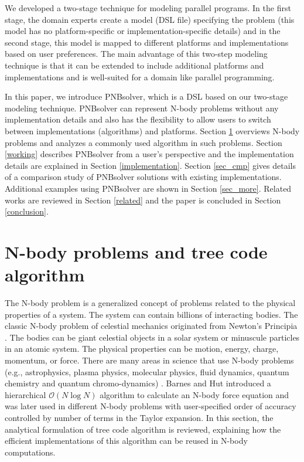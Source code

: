 \documentclass[draftclsnofoot]{elsarticle}
\begin{document}
We developed a two-stage technique for modeling parallel programs. In the first stage, the domain experts create a model (DSL file) specifying 
the problem (this model has no platform-specific or implementation-specific details) and in the second stage,  this model is mapped to different platforms and implementations
 based on user preferences. The main advantage of this two-step modeling technique is that it can be extended to include additional platforms and implementations and is well-suited
 for a domain like parallel programming.

In this paper, we introduce PNBsolver, which is a DSL based on our two-stage modeling technique. PNBsolver can represent
N-body problems without any implementation details and also has the flexibility to allow users to switch between implementations (algorithms) and platforms. 
Section \ref{analysis} overviews N-body problems and analyzes a commonly used algorithm in such problems. Section \ref{working} describes PNBsolver from a user's perspective
and the implementation details are explained in Section \ref{implementation}. Section \ref{sec_cmp} gives details of a comparison study of PNBsolver solutions with existing
implementations. Additional examples using PNBsolver are shown in Section \ref{sec_more}. Related works are reviewed in Section \ref{related} and the paper is concluded in 
Section \ref{conclusion}.


\section{N-body problems and tree code algorithm}
\label{analysis}

The N-body problem is a generalized concept of problems related to the physical properties of a system.
 The system can contain billions of interacting bodies.
The classic N-body problem of celestial mechanics originated from Newton's Principia \cite{diacu}.  The bodies can be giant celestial 
objects in a solar system or minuscule particles in an atomic system. The physical properties can be motion, energy, charge, momentum, or force. 
There are many areas in science that use N-body problems (e.g., astrophysics, plasma physics, molecular physics, fluid dynamics, 
quantum chemistry and quantum chromo-dynamics) \cite{watson,jastrow,sasai,carlson}.
Barnes and Hut \cite{barnes} introduced a hierarchical $ \mathcal{O}(N\log{N})$ algorithm to calculate an N-body force equation and was later used in 
different N-body problems \cite{krasny1, krasny2, xu} 
with user-specified order of accuracy controlled by number of terms in the Taylor expansion. In this section, the analytical formulation of tree code algorithm is 
reviewed, explaining how the efficient implementations of this algorithm can be reused in N-body computations. 
\end{document}
